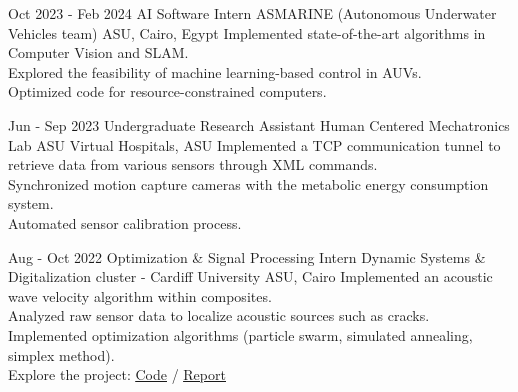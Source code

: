 \documentclass[hidelinks]{report}
\begin{document}
\entry
    {Oct 2023 - Feb 2024}
    {AI Software Intern}
    {ASMARINE (Autonomous Underwater Vehicles team)}
    {ASU, Cairo, Egypt}
    {
      \textbullet Implemented state-of-the-art algorithms in Computer Vision and SLAM. \\
      \textbullet Explored the feasibility of machine learning-based control in AUVs. \\
      \textbullet Optimized code for resource-constrained computers.
    }

\entry
    {Jun - Sep 2023}
    {Undergraduate Research Assistant}
    {Human Centered Mechatronics Lab}
    {ASU Virtual Hospitals, ASU}
    {
      \textbullet Implemented a TCP communication tunnel to retrieve data from various sensors through XML commands. \\
      \textbullet Synchronized motion capture cameras with the metabolic energy consumption system. \\
      \textbullet Automated sensor calibration process.
    }

\entry
    {Aug - Oct 2022}
    {Optimization \& Signal Processing Intern}
    {Dynamic Systems \& Digitalization cluster - Cardiff University}
    {ASU, Cairo}
    {
      \textbullet Implemented an acoustic wave velocity algorithm within composites.\\
      \textbullet Analyzed raw sensor data to localize acoustic sources such as cracks. \\
      \textbullet Implemented optimization algorithms (particle swarm, simulated annealing, simplex method).\\
      \textbullet Explore the project: 
      \href{\github/AE-software.git}{\underline{Code}} / %
      \href{\github/AE-software/blob/master/Final-Report/Report.pdf}{\underline{Report}}
    }

\vspace{2mm}



\vspace{2mm}

\end{document}
